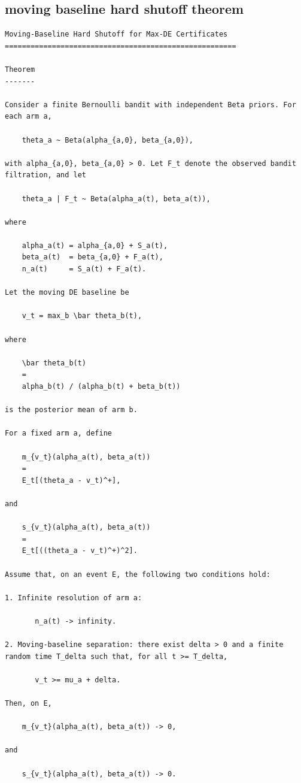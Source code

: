 \subsection{moving baseline hard shutoff theorem}
\begin{small}
\begin{verbatim}
Moving-Baseline Hard Shutoff for Max-DE Certificates
======================================================

Theorem
-------

Consider a finite Bernoulli bandit with independent Beta priors. For each arm a,

    theta_a ~ Beta(alpha_{a,0}, beta_{a,0}),

with alpha_{a,0}, beta_{a,0} > 0. Let F_t denote the observed bandit filtration, and let

    theta_a | F_t ~ Beta(alpha_a(t), beta_a(t)),

where

    alpha_a(t) = alpha_{a,0} + S_a(t),
    beta_a(t)  = beta_{a,0} + F_a(t),
    n_a(t)     = S_a(t) + F_a(t).

Let the moving DE baseline be

    v_t = max_b \bar theta_b(t),

where

    \bar theta_b(t)
    =
    alpha_b(t) / (alpha_b(t) + beta_b(t))

is the posterior mean of arm b.

For a fixed arm a, define

    m_{v_t}(alpha_a(t), beta_a(t))
    =
    E_t[(theta_a - v_t)^+],

and

    s_{v_t}(alpha_a(t), beta_a(t))
    =
    E_t[((theta_a - v_t)^+)^2].

Assume that, on an event E, the following two conditions hold:

1. Infinite resolution of arm a:

       n_a(t) -> infinity.

2. Moving-baseline separation: there exist delta > 0 and a finite random time T_delta such that, for all t >= T_delta,

       v_t >= mu_a + delta.

Then, on E,

    m_{v_t}(alpha_a(t), beta_a(t)) -> 0,

and

    s_{v_t}(alpha_a(t), beta_a(t)) -> 0.


\end{verbatim}
\end{small}
